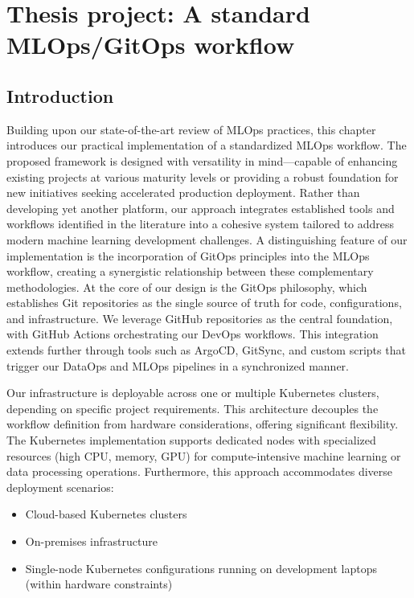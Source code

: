 \chapter{Thesis project: A standard MLOps/GitOps workflow}\label{ch:thesis-project:-a-standard-mlops-ci/cd-workflow}
\section{Introduction}\label{sec:introduction}
Building upon our state-of-the-art review of MLOps practices, this chapter introduces our practical implementation of a standardized MLOps workflow.
The proposed framework is designed with versatility in mind—capable of enhancing existing projects at various maturity levels or providing a robust foundation for new initiatives seeking accelerated production deployment.
Rather than developing yet another platform, our approach integrates established tools and workflows identified in the literature into a cohesive system tailored to address modern machine learning development challenges.
A distinguishing feature of our implementation is the incorporation of GitOps principles into the MLOps workflow, creating a synergistic relationship between these complementary methodologies.
At the core of our design is the GitOps philosophy, which establishes Git repositories as the single source of truth for code, configurations, and infrastructure.
We leverage GitHub repositories as the central foundation, with GitHub Actions orchestrating our DevOps workflows.
This integration extends further through tools such as ArgoCD, GitSync, and custom scripts that trigger our DataOps and MLOps pipelines in a synchronized manner.

Our infrastructure is deployable across one or multiple Kubernetes clusters, depending on specific project requirements.
This architecture decouples the workflow definition from hardware considerations, offering significant flexibility.
The Kubernetes implementation supports dedicated nodes with specialized resources (high CPU, memory, GPU) for compute-intensive machine learning or data processing operations.
Furthermore, this approach accommodates diverse deployment scenarios:

\begin{itemize}
\item Cloud-based Kubernetes clusters
\item On-premises infrastructure
\item Single-node Kubernetes configurations running on development laptops (within hardware constraints)
\end{itemize}


